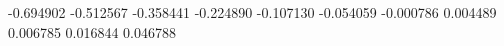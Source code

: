 -0.694902
-0.512567
-0.358441
-0.224890
-0.107130
-0.054059
-0.000786
0.004489
0.006785
0.016844
0.046788
